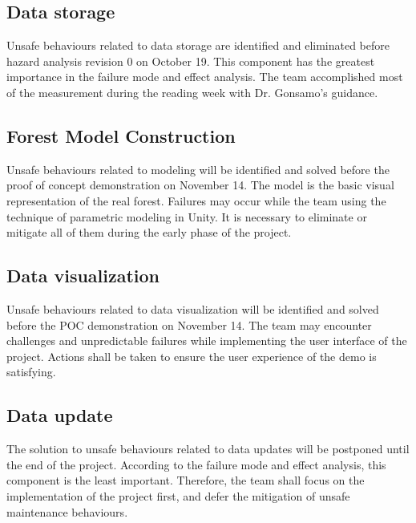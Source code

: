 \documentclass{article}
\begin{document}
\subsection{Data storage}
Unsafe behaviours related to data storage are identified and
eliminated before hazard analysis revision 0 on October 19. This component has
the greatest importance in the failure mode and effect analysis. The team
accomplished most of the measurement during the reading week with Dr.
Gonsamo's guidance.

\subsection{Forest Model Construction}
Unsafe behaviours related to modeling will be identified and solved before the
proof of concept demonstration on November 14. The model is the basic visual
representation of the real forest. Failures may occur while the team using the
technique of parametric modeling in Unity. It is necessary to eliminate or
mitigate all of them during the early phase of the project.

\subsection{Data visualization}
Unsafe behaviours related to data visualization will be identified and solved before the POC demonstration on November 14. The team may encounter challenges and
unpredictable failures while implementing the user interface of the project. Actions shall be taken to ensure the user experience of the demo is satisfying.

\subsection{Data update}
The solution to unsafe behaviours related to data updates will
be postponed until the end of the project. According to the failure mode and effect analysis, this component is the least important. Therefore, the team shall focus on the implementation of the project first, and defer the mitigation of unsafe maintenance behaviours.
\end{document}
